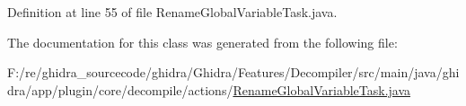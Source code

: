 Definition at line 55 of file Rename\+Global\+Variable\+Task.\+java.



The documentation for this class was generated from the following file\+:\begin{DoxyCompactItemize}
\item 
F\+:/re/ghidra\+\_\+sourcecode/ghidra/\+Ghidra/\+Features/\+Decompiler/src/main/java/ghidra/app/plugin/core/decompile/actions/\mbox{\hyperlink{_rename_global_variable_task_8java}{Rename\+Global\+Variable\+Task.\+java}}\end{DoxyCompactItemize}
